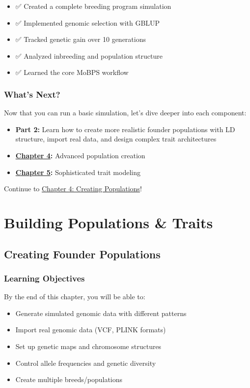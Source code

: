 \documentclass[
  letterpaper,
]{book}
\providecommand{\tightlist}{%
  \setlength{\itemsep}{0pt}\setlength{\parskip}{0pt}}
\begin{document}
\begin{itemize}
\tightlist
\item
  ✅ Created a complete breeding program simulation
\item
  ✅ Implemented genomic selection with GBLUP
\item
  ✅ Tracked genetic gain over 10 generations
\item
  ✅ Analyzed inbreeding and population structure
\item
  ✅ Learned the core MoBPS workflow
\end{itemize}

\section{What's Next?}\label{whats-next-2}

Now that you can run a basic simulation, let's dive deeper into each
component:

\begin{itemize}
\tightlist
\item
  \textbf{Part 2:} Learn how to create more realistic founder
  populations with LD structure, import real data, and design complex
  trait architectures
\item
  \textbf{\hyperref[sec-creating-populations]{Chapter 4}:} Advanced
  population creation
\item
  \textbf{\hyperref[sec-trait-architecture]{Chapter 5}:} Sophisticated
  trait modeling
\end{itemize}

Continue to \href{04-creating-populations.qmd}{Chapter 4: Creating
Populations}!

\part{Building Populations \& Traits}

\chapter{Creating Founder Populations}\label{sec-creating-populations}

\section{Learning Objectives}\label{learning-objectives-3}

By the end of this chapter, you will be able to:

\begin{itemize}
\tightlist
\item
  Generate simulated genomic data with different patterns
\item
  Import real genomic data (VCF, PLINK formats)
\item
  Set up genetic maps and chromosome structures
\item
  Control allele frequencies and genetic diversity
\item
  Create multiple breeds/populations
\end{itemize}
\end{document}
